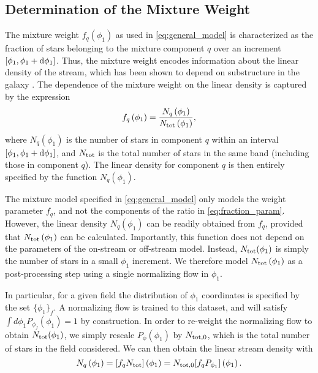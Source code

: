 \documentclass[twocolumn]{aastex631}
\begin{document}
    \subsection{Determination of the Mixture Weight} \label{sub:method:mixture_weight}

        The mixture weight $f_q(\phi_1)$ as used in \autoref{eq:general_model}
        is characterized as the fraction of stars belonging to the mixture
        component $q$ over an increment $[\phi_1, \phi_1 + \dif{\phi_1}]$. Thus,
        the mixture weight encodes information about the linear density of the
        stream, which has been shown to depend on substructure in the galaxy
        \citep{Siegal-GaskinsValluri2009, Yoon+2011}. The dependence of the
        mixture weight on the linear density is captured by the expression
        \begin{equation}\label{eq:fraction_param}
            f_q\left(\phi_1\right) = \frac{N_q\left(\phi_1\right)}{N_{\rm tot}\left(\phi_1\right)},
        \end{equation}
        where $N_q\left(\phi_1\right)$ is the number of stars in component $q$
        within an interval $[\phi_1, \phi_1 + \dif{\phi_1}]$, and $N_{\rm tot}$
        is the total number of stars in the same band (including those in
        component $q$). The linear  density for component $q$ is then entirely
        specified by the function $N_q(\phi_1)$.

        The mixture model specified in \autoref{eq:general_model} only models
        the weight parameter $f_q$, and not the components of the ratio in
        \autoref{eq:fraction_param}. However, the linear density $N_q(\phi_1)$
        can be readily obtained from $f_q$, provided that $N_{\rm
        tot}\left(\phi_1\right)$ can be calculated. Importantly, this function
        does not depend on the parameters of the on-stream or off-stream model.
        Instead, $N_{\rm tot}(\phi_1)$ is simply the number of stars in a small
        $\phi_1$ increment. We therefore model $N_{\rm tot}\left(\phi_1\right)$
        as a post-processing step using a single normalizing flow in $\phi_1$. 

        In particular, for a given field the distribution of $\phi_1$
        coordinates is specified by the set $\{\phi_1\}_f$. A normalizing flow
        is trained to this dataset, and will satisfy $\int d\phi_1
        P_{\phi_f}(\phi_1) = 1$ by construction. In order to re-weight the
        normalizing flow to obtain $N_{\rm tot}(\phi_1)$, we simply rescale
        $P_{\phi}(\phi_1)$ by $N_{\rm tot,0}$, which is the total number of
        stars in the field considered. We can then obtain the linear stream
        density with
        \begin{equation}
            N_q\left(\phi_1\right) = [f_q N_{\rm tot}] \left(\phi_1\right)  = N_{\rm tot,0}[f_q P_{\phi_1}]\left(\phi_1\right) .
        \end{equation}
\end{document}
